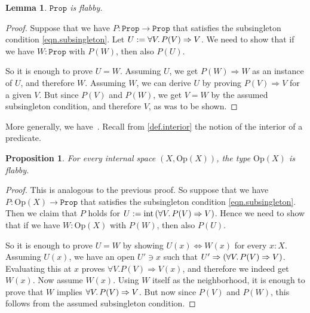 \documentclass[11pt, oneside, article]{memoir}
\theoremstyle{plain}
\newtheorem{proposition}[theorem]{Proposition}
\newtheorem{lemma}[theorem]{Lemma}
\theoremstyle{definition}
\theoremstyle{remark}
\DeclareMathOperator{\interior}{int}
\newcommand{\const}[1]{\mathtt{#1}}
\newcommand{\Set}[1]{\mathrm{#1}}
\newcommand{\Prop}{\const{Prop}}
\newcommand{\Op}{\Set{Op}}
\newcommand{\imp}{\Rightarrow}
\begin{document}
\begin{lemma}
$\Prop$ is flabby.
\end{lemma}

\begin{proof}
Suppose that we have $P : \Prop \to \Prop$ that satisfies the subsingleton condition \cref{eqn.subsingleton}. Let $U := \forall V \ldotp P(V) \imp V$. We need to show that if we have $W : \Prop$ with $P(W)$, then also $P(U)$.

So it is enough to prove $U = W$. Assuming $U$, we get $P(W) \imp W$ as an instance of $U$, and therefore $W$. Assuming $W$, we can derive $U$ by proving $P(V) \imp V$ for a given $V$. But since $P(V)$ and $P(W)$, we get $V = W$ by the assumed subsingleton condition, and therefore $V$, as was to be shown.
\end{proof}

More generally, we have~\cite[Lemma~1.2]{moerdijk}. 
Recall from \cref{def.interior} the notion of the interior of a predicate.


\begin{proposition}
	\label{prop:opens_flabby}
	For every internal space $(X,\Op(X))$, the type $\Op(X)$ is flabby.
\end{proposition}

\begin{proof}
This is analogous to the previous proof. So suppose that we have $P : \Op(X) \to \Prop$ that satisfies the subsingleton condition \cref{eqn.subsingleton}. Then we claim that $P$ holds for $U := \interior\left(\forall V \ldotp P(V) \imp V\right)$. Hence we need to show that if we have $W : \Op(X)$ with $P(W)$, then also $P(U)$.

	So it is enough to prove $U = W$ by showing $U(x) \Leftrightarrow W(x)$ for every $x : X$. Assuming $U(x)$, we have an open $U'\ni x$ such that $U' \imp (\forall V \ldotp P(V) \imp V)$. Evaluating this at $x$ proves $\forall V. P(V) \imp V(x)$, and therefore we indeed get $W(x)$. Now assume $W(x)$. Using $W$ itself as the neighborhood, it is enough to prove that $W$ implies $\forall V\ldotp P(V) \imp V$. But now since $P(V)$ and $P(W)$, this follows from the assumed subsingleton condition.
\end{proof}

\end{document}
